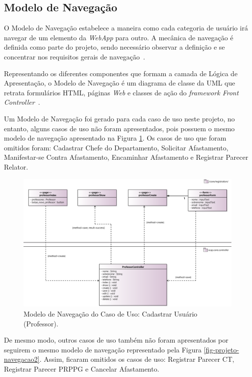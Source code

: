 \subsection{Modelo de Navegação}
\label{sec-projeto-modelo-navegacao}

O Modelo de Navegação estabelece a maneira como cada categoria de usuário irá navegar de um elemento da \textit{WebApp} para outro. A mecânica de navegação é definida como parte do projeto, sendo necessário observar a definição e se concentrar nos requisitos gerais de navegação~\cite{pressman:es11}. 

Representando os diferentes componentes que formam a camada de Lógica de Apresentação, o Modelo de Navegação é um diagrama de classe da UML que retrata formulários HTML, páginas \textit{Web} e classes de ação do \textit{framework Front Controller}~\cite{souza:masterthesis07}.

Um Modelo de Navegação foi gerado para cada caso de uso neste projeto, no entanto, alguns casos de uso não foram apresentados, pois possuem o mesmo modelo de navegação apresentado na Figura \ref{fig-projeto-navegacao1}. Os casos de uso que foram omitidos foram: Cadastrar Chefe do Departamento, Solicitar Afastamento, Manifestar-se Contra Afastamento, Encaminhar Afastamento e Registrar Parecer Relator.

\begin{figure}[h]
	\centering
	\includegraphics[scale=0.4]{figuras/fig-projeto-navegacao1} 
	\caption{Modelo de Navegação do Caso de Uso: Cadastrar Usuário (Professor).}
	\label{fig-projeto-navegacao1}
\end{figure}

De mesmo modo, outros casos de uso também não foram apresentados por seguirem o mesmo modelo de navegação representado pela Figura \ref{fig-projeto-navegacao2}. Assim, ficaram omitidos os casos de uso: Registrar Parecer CT, Registrar Parecer PRPPG e Cancelar Afastamento.

